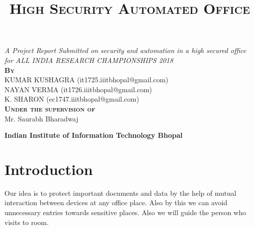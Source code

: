 \documentclass[12pt]{article}
\begin{document}

\title{\textsc{\huge \bfseries High Security Automated Office}}

\clearpage\maketitle
\thispagestyle{empty}
\maketitle



\begin{center}


\emph{A Project Report Submitted 
on security and automation in a high secured office
 \\ for ALL INDIA RESEARCH CHAMPIONSHIPS 2018} \\[3cm]

\textsc{\bfseries By}\\[0.75cm]
KUMAR KUSHAGRA (it1725.iiitbhopal@gmail.com) \\
NAYAN VERMA (it1726.iiitbhopal@gmail.com)\\
K. SHARON (ec1747.iiitbhopal@gmail.com)\\


\vspace{3cm}
\textsc{\bfseries Under the supervision of}\\[0.75cm]

Mr. Saurabh Bharadwaj

\vspace{4.5cm}

\bfseries
Indian Institute of Information Technology Bhopal\\

\end{center}

\newpage
\clearpage
{}
\setcounter{page}{1}
\thispagestyle{empty}
\tableofcontents


\newpage


\newpage
\listoffigures
\newpage
\clearpage
\setcounter{page}{1}

\section{Introduction}
Our idea is to protect important documents and data by the help of mutual interaction between devices at any office place. Also by this we can avoid unnecessary entries towards sensitive places. Also we will guide the person who visits to room.  
\end{document}
